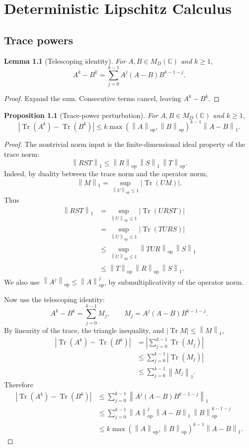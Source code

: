 \documentclass[11pt,oneside]{book}
\newtheorem{proposition}[theorem]{Proposition}
\newtheorem{lemma}[theorem]{Lemma}
\DeclareMathOperator{\Tr}{Tr}
\newcommand{\C}{\mathbb C}
\newcommand{\1}{\mathbf 1}
\newcommand{\op}{\mathrm{op}}
\newcommand{\norm}[1]{\left\|#1\right\|}
\begin{document}
\chapter{Deterministic Lipschitz Calculus}

\section{Trace powers}

\begin{lemma}[Telescoping identity]
For \(A,B\in M_D(\C)\) and \(k\ge1\),
\[
  A^k-B^k
  =
  \sum_{j=0}^{k-1}A^j(A-B)B^{k-1-j}.
\]
\end{lemma}

\begin{proof}
Expand the sum.  Consecutive terms cancel, leaving \(A^k-B^k\).
\end{proof}

\begin{proposition}[Trace-power perturbation]
For \(A,B\in M_D(\C)\) and \(k\ge1\),
\[
  |\Tr(A^k)-\Tr(B^k)|
  \le
  k\max(\norm A_{\op},\norm B_{\op})^{k-1}\norm{A-B}_1.
\]
\end{proposition}

\begin{proof}
The nontrivial norm input is the finite-dimensional ideal property of the
trace norm:
\[
  \norm{RST}_1\le \norm R_{\op}\,\norm S_1\,\norm T_{\op}.
\]
Indeed, by duality between the trace norm and the operator norm,
\[
  \norm M_1=\sup_{\norm U_{\op}\le1}|\Tr(UM)|.
\]
Thus
\[
\begin{aligned}
  \norm{RST}_1
  &=
  \sup_{\norm U_{\op}\le1}|\Tr(URST)|  \\
  &=
  \sup_{\norm U_{\op}\le1}|\Tr(TURS)|  \\
  &\le
  \sup_{\norm U_{\op}\le1}\norm{TUR}_{\op}\,\norm S_1 \\
  &\le
  \norm T_{\op}\,\norm R_{\op}\,\norm S_1 .
\end{aligned}
\]
We also use \(\norm{A^j}_{\op}\le\norm A_{\op}^j\), by submultiplicativity of
the operator norm.

Now use the telescoping identity:
\[
  A^k-B^k=\sum_{j=0}^{k-1}M_j,
  \qquad
  M_j=A^j(A-B)B^{k-1-j}.
\]
By linearity of the trace, the triangle inequality, and
\(|\Tr M|\le\norm M_1\),
\[
\begin{aligned}
|\Tr(A^k)-\Tr(B^k)|
&=
\left|\sum_{j=0}^{k-1}\Tr(M_j)\right|\\
&\le
\sum_{j=0}^{k-1}|\Tr(M_j)|\\
&\le
\sum_{j=0}^{k-1}\norm{M_j}_1.
\end{aligned}
\]
Therefore
\[
\begin{aligned}
|\Tr(A^k)-\Tr(B^k)|
&\le
\sum_{j=0}^{k-1}\norm{A^j(A-B)B^{k-1-j}}_1\\
&\le
\sum_{j=0}^{k-1}
\norm A_{\op}^j\,\norm{A-B}_1\,\norm B_{\op}^{k-1-j}\\
&\le
k\max(\norm A_{\op},\norm B_{\op})^{k-1}\norm{A-B}_1.
\end{aligned}
\]
\end{proof}
\end{document}
